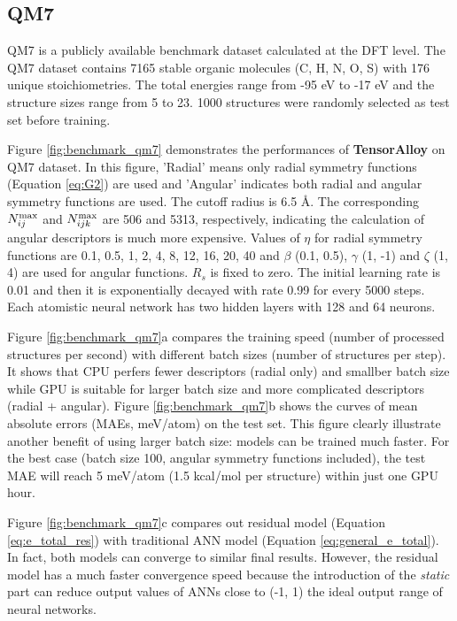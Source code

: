 \documentclass[preprint]{revtex4-2}
\begin{document}
\subsection{QM7}

QM7\cite{QM7_1,QM7_2} is a publicly available benchmark dataset calculated at 
the DFT level. The QM7 dataset contains 7165 stable organic molecules 
(C, H, N, O, S) with 176 unique stoichiometries. The total energies range from 
-95 eV to -17 eV and the structure sizes range from 5 to 23. 1000 structures 
were randomly selected as test set before training.

Figure \ref{fig:benchmark_qm7} demonstrates the performances of 
\textbf{TensorAlloy} on QM7 dataset. In this figure, 'Radial' means only radial 
symmetry functions (Equation \ref{eq:G2}) are used and 'Angular' indicates both 
radial and angular symmetry functions are used. The cutoff radius is 6.5 \AA.
The corresponding $N_{ij}^{\mathrm{max}}$ and $N_{ijk}^{\mathrm{max}}$ are 506 and 5313, respectively, 
indicating the calculation of angular descriptors is much more expensive.
Values of $\eta$ for radial symmetry functions are 0.1, 0.5, 1, 2, 4, 8, 12, 16, 
20, 40 and $\beta$ (0.1, 0.5), $\gamma$ (1, -1) and $\zeta$ (1, 4) are used for
angular functions. $R_s$ is fixed to zero. The initial learning rate is 0.01 and 
then it is exponentially decayed with rate 0.99 for every 5000 steps. 
Each atomistic neural network has two hidden layers with 128 and 64 neurons.

Figure \ref{fig:benchmark_qm7}a compares the training speed (number of processed 
structures per second) with different batch sizes (number of structures per 
step). It shows that CPU perfers fewer descriptors (radial only) and smallber 
batch size while GPU is suitable for larger batch size and more complicated 
descriptors (radial + angular). 
Figure \ref{fig:benchmark_qm7}b shows the curves of mean absolute errors 
(MAEs, meV/atom) on the test set. This figure clearly illustrate another benefit 
of using larger batch size: models can be trained much faster. For the best case 
(batch size 100, angular symmetry functions included), the test MAE will reach 5 
meV/atom (1.5 kcal/mol per structure) within just one GPU hour. 

Figure \ref{fig:benchmark_qm7}c compares out residual model (Equation 
\ref{eq:e_total_res}) with traditional ANN model (Equation 
\ref{eq:general_e_total}). In fact, both models can converge to similar final 
results. However, the residual model has a much faster convergence speed because 
the introduction of the \textit{static} part can reduce output values of ANNs
close to (-1, 1) \textemdash the ideal output range of neural networks.
\end{document}
